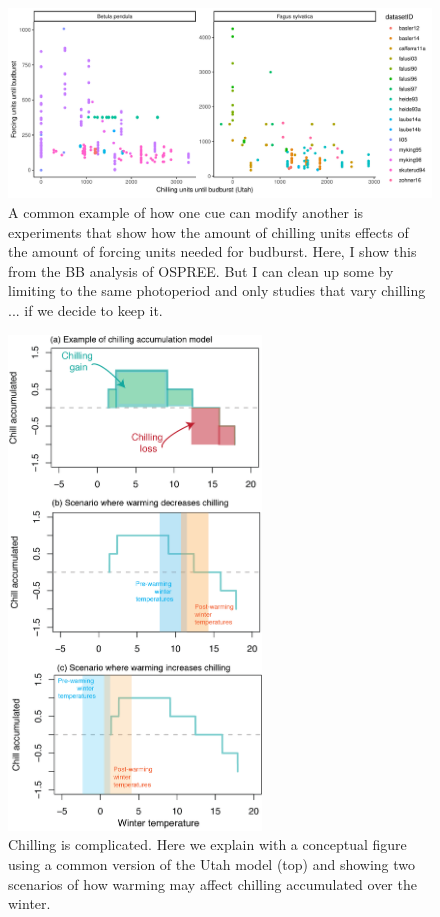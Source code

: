 \documentclass[11pt,letter]{article}
\begin{document}
\clearpage

\begin{figure}
\centering
\includegraphics[width=1\textwidth]{..//..//analyses/bb_analysis/figures/gddbyutah_betpenfagsyl.pdf}
\caption{A common example of how one cue can modify another is experiments that show how the amount of chilling units effects of the amount of forcing units needed for budburst. Here, I show this from the BB analysis of OSPREE. But I can clean up some by limiting to the same photoperiod and only studies that vary chilling ... if we decide to keep it.}
  \label{fig:gddbyutah}
\end{figure}



\begin{figure}[t!]
\centering
\includegraphics[width=0.6\textwidth]{figures/limcues_chilling.png}
\caption{Chilling is complicated. Here we explain with a conceptual figure using a common version of the Utah model (top) and showing two scenarios of how warming may affect chilling accumulated over the winter.}
  \label{fig:chilling}
\end{figure}
\end{document}
